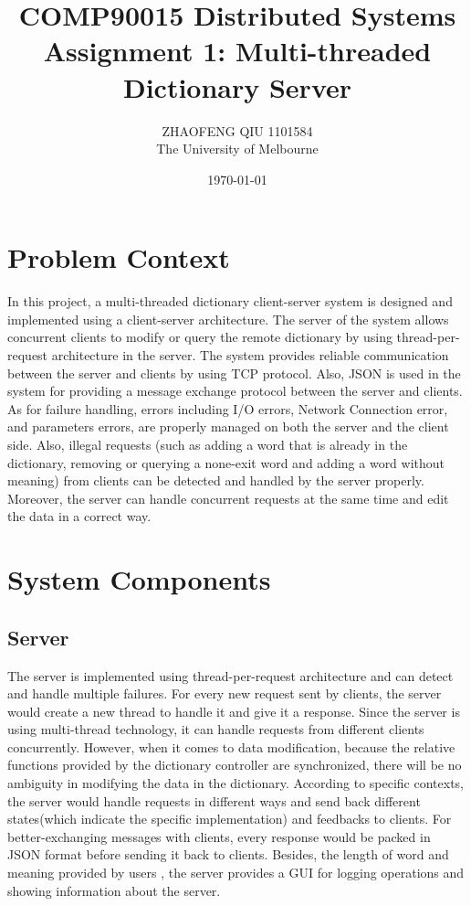 \documentclass[a4paper]{article}
\title{COMP90015 Distributed Systems \\Assignment 1: Multi-threaded Dictionary Server}
\author{ZHAOFENG QIU 1101584\\The University of Melbourne}
\date{\today}
\begin{document}
\maketitle

\section{Problem Context}
\label{sec:introduction}

In this project, a multi-threaded dictionary client-server system is designed and implemented using a client-server architecture. The server of the system allows concurrent clients to modify or query the remote dictionary by using thread-per-request architecture in the server. The system provides reliable communication between the server and clients by using TCP protocol. Also, JSON is used in the system for providing a message exchange protocol between the server and clients. As for failure handling, errors including I/O errors, Network Connection error, and parameters errors, are properly managed on both the server and the client side. Also, illegal requests (such as adding a word that is already in the dictionary, removing or querying a none-exit word and adding a word without meaning) from clients can be detected and handled by the server properly. Moreover, the server can handle concurrent requests at the same time and edit the data in a correct way.

\section{System Components} %
\label{sec:theory}
\subsection{Server}
The server is implemented using thread-per-request architecture and can detect and handle multiple failures. For every new request sent by clients, the server would create a new thread to handle it and give it a response. Since the server is using multi-thread technology, it can handle requests from different clients concurrently. However, when it comes to data modification, because the relative functions provided by the dictionary controller are synchronized, there will be no ambiguity in modifying the data in the dictionary. According to specific contexts, the server would handle requests in different ways and send back different states(which indicate the specific implementation) and feedbacks to clients. For better-exchanging messages with clients,  every response would be packed in JSON format before sending it back to clients. Besides, the length of word and meaning provided by users , the server provides a GUI for logging operations and showing information about the server.
\end{document}
